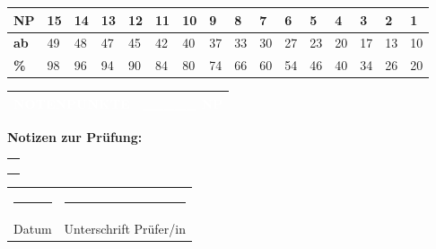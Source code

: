 \documentclass[11pt, a4paper]{article}
\begin{document}
\vspace{4pt}

{\small
\begin{tabularx}{\textwidth}{|*{16}{C{0.85cm}|}}
\hline
{}
\textbf{NP} & 15 & 14 & 13 & 12 & 11 & 10 & 9 & 8 & 7 & 6 & 5 & 4 & 3 & 2 & 1 \\
\hline
\textbf{ab} & 49 & 48 & 47 & 45 & 42 & 40 & 37 & 33 & 30 & 27 & 23 & 20 & 17 & 13 & 10 \\
\hline
\textbf{\%} & 98 & 96 & 94 & 90 & 84 & 80 & 74 & 66 & 60 & 54 & 46 & 40 & 34 & 26 & 20 \\
\hline
\end{tabularx}}

\vspace{12pt}

\begin{tabularx}{\textwidth}{|X|C{3cm}|}
\hline
{}
\textcolor{white}{\textbf{NOTENPUNKTE}} & \textcolor{white}{\textbf{\_\_\_\_\_ NP}} \\
\hline
\end{tabularx}

\vspace{16pt}


\textbf{Notizen zur Prüfung:}

\vspace{4pt}

\begin{tabularx}{\textwidth}{|X|}
\hline
\\[4em]
\\[4em]
\\[4em]
\hline
\end{tabularx}

\vspace{12pt}

\begin{tabularx}{\textwidth}{X X}
\rule{6cm}{0.4pt} & \rule{6cm}{0.4pt} \\
Datum & Unterschrift Prüfer/in \\
\end{tabularx}

\vspace{16pt}

\end{document}
